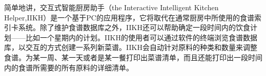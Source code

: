 简单地讲，交互式智能厨房助手（the Interactive Intelligent Kitchen Helper,IIKH）是一个基于PC的应用程序，它将取代在通常厨房中所使用的食谱索引卡系统。除了维护食谱数据库之外，IIKH还可以帮助确定一段时间内的饮食计划——比如一个星期内的计划。IIKH的使用者可以通过软件的终端浏览食谱数据库，以交互的方式创建一系列新菜谱。IIKH会自动针对原料的种类和数量来调整食谱。为某一周、某一天或者是某一餐打印出菜谱清单，而且还能打印出一段时间内的食谱所需要的所有原料的详细清单。






























































